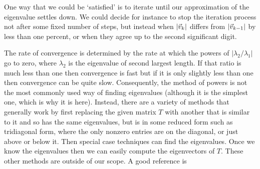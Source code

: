 One way that we could be `satisfied'
is to iterate until our approximation of the eigenvalue settles down.
We could decide for instance to stop the iteration
process not after some fixed number of steps, but instead
when $\lvert\vec{v}_k\rvert$ differs from $\lvert\vec{v}_{k-1}\rvert$ 
by less than one percent, or when they agree up to the 
second significant digit. 

The rate of convergence is determined by the rate at which 
the powers of $|\lambda_2/\lambda_1|$ go to zero,
where $\lambda_2$ is the eigenvalue of second largest length. 
If that ratio is much less than one then convergence is fast but
if it is only slightly less than one then convergence can be quite slow.
Consequently, the method of powers
is not the most commonly used way of finding eigenvalues
(although it is the simplest one, which is why it is here).
Instead, there are a variety of methods that generally work by first 
replacing the given matrix $T$ with another that is similar to it
and so has the same eigenvalues, but is in some reduced form
such as 
tridiagonal form,
where the only nonzero
entries are on the diagonal, or just above or below it.
Then special case techniques can find the eigenvalues.
Once we know the eigenvalues then we can easily compute 
the eigenvectors of $T$. 
These other methods are outside of our scope.
A good reference is \cite{Goult}



